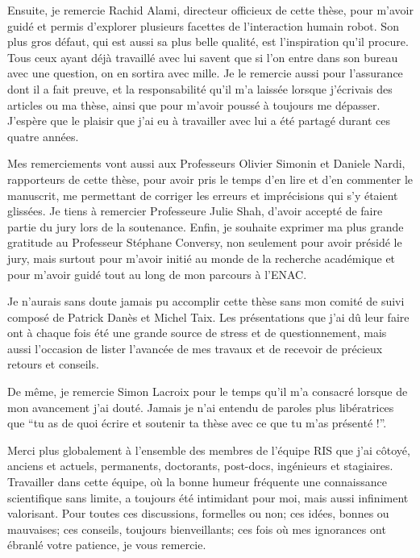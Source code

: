 \documentclass[english,a4paper,11pt,twoside]{StyleThese}
\begin{document}
Ensuite, je remercie Rachid Alami, directeur officieux de cette thèse, pour m'avoir guidé et permis d'explorer plusieurs facettes de l'interaction humain robot. Son plus gros défaut, qui est aussi sa plus belle qualité, est l'inspiration qu'il procure. Tous ceux ayant déjà travaillé avec lui savent que si l'on entre dans son bureau avec une question, on en sortira avec mille. Je le remercie aussi pour l'assurance dont il a fait preuve, et la responsabilité qu'il m'a laissée lorsque j'écrivais des articles ou ma thèse, ainsi que pour m'avoir poussé à toujours me dépasser. J'espère que le plaisir que j'ai eu à travailler avec lui a été partagé durant ces quatre années.

Mes remerciements vont aussi aux Professeurs Olivier Simonin et Daniele Nardi, rapporteurs de cette thèse, pour avoir pris le temps d'en lire et d'en commenter le manuscrit, me permettant de corriger les erreurs et imprécisions qui s'y étaient glissées.
Je tiens à remercier Professeure Julie Shah, d'avoir accepté de faire partie du jury lors de la soutenance.
Enfin, je souhaite exprimer ma plus grande gratitude au Professeur Stéphane Conversy, non seulement pour avoir présidé le jury, mais surtout pour m'avoir initié au monde de la recherche académique et pour m'avoir guidé tout au long de mon parcours à l'ENAC.

Je n'aurais sans doute jamais pu accomplir cette thèse sans mon comité de suivi composé de Patrick Danès et Michel Taix. Les présentations que j'ai dû leur faire ont à chaque fois été une grande source de stress et de questionnement, mais aussi l'occasion de lister l'avancée de mes travaux et de recevoir de précieux retours et conseils.

De même, je remercie Simon Lacroix pour le temps qu'il m'a consacré lorsque de mon avancement j'ai douté. Jamais je n'ai entendu de paroles plus libératrices que ``tu as de quoi écrire et soutenir ta thèse avec ce que tu m'as présenté !''.

Merci plus globalement à l'ensemble des membres de l'équipe RIS que j'ai côtoyé, anciens et actuels, permanents, doctorants, post-docs, ingénieurs et stagiaires. Travailler dans cette équipe, où la bonne humeur fréquente une connaissance scientifique sans limite, a toujours été intimidant pour moi, mais aussi infiniment valorisant. Pour toutes ces discussions, formelles ou non; ces idées, bonnes ou mauvaises; ces conseils, toujours bienveillants; ces fois où mes ignorances ont ébranlé votre patience, je vous remercie.
\end{document}
